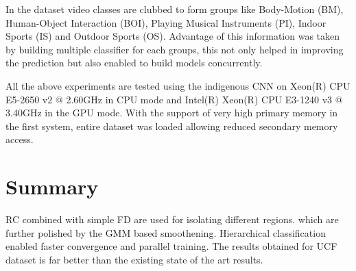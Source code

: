 \par In the dataset video classes are clubbed to form groups like Body-Motion (BM), Human-Object Interaction (BOI), Playing Musical Instruments (PI), Indoor Sports (IS) and Outdoor Sports (OS). Advantage of this information was taken by building multiple classifier for each groups, this not only helped in improving the prediction but also enabled to build models concurrently.

\par All the above experiments are tested using the indigenous CNN on  Xeon(R) CPU E5-2650 v2 @ 2.60GHz in CPU mode and Intel(R) Xeon(R) CPU E3-1240 v3 @ 3.40GHz in the GPU mode. With the support of very high primary memory in  the first system, entire dataset was loaded allowing reduced secondary memory access.

\section{Summary}
RC combined with simple FD are used for isolating different regions. which are further polished by the GMM based smoothening. Hierarchical classification enabled faster convergence and parallel training. The results obtained for UCF dataset is far better than the existing state of the art results.